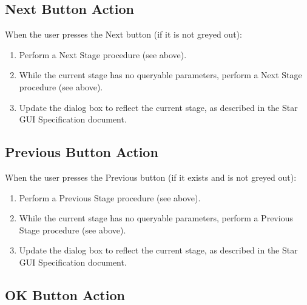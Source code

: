 \documentclass[11pt]{article}
\begin{document}
\subsection{Next Button Action}

When the user presses the Next button (if it is not greyed out):
\begin{enumerate}
\item Perform a Next Stage procedure (see above).
\item While the current stage has no queryable parameters, perform
  a Next Stage procedure (see above).
\item Update the dialog box to reflect the current stage, as described
  in the Star GUI Specification document.
\end{enumerate}

\subsection{Previous Button Action}

When the user presses the Previous button (if it exists and is not greyed
out):
\begin{enumerate}
\item Perform a Previous Stage procedure (see above).
\item While the current stage has no queryable parameters, perform
  a Previous Stage procedure (see above).
\item Update the dialog box to reflect the current stage, as described
  in the Star GUI Specification document.
\end{enumerate}

\subsection{OK Button Action}
\end{document}
